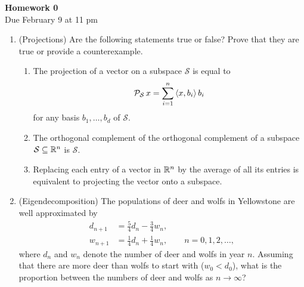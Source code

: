 \documentclass[12pt,twoside]{article}
\begin{document}
\begin{center}
{\large{\textbf{Homework 0}} } \vspace{0.2cm}\\
Due February 9 at 11 pm
\end{center}

\begin{enumerate}
\item (Projections) Are the following statements true or false? Prove that they are true or provide a counterexample. 
\begin{enumerate}
\item The projection of a vector on a subspace $\mathcal{S}$ is equal to 
\begin{align*}
\mathcal{P}_{\mathcal{S}} \, x = \sum_{i=1}^n \left \langle x, b_i\right \rangle b_i
\end{align*}
for any basis $b_1, \ldots, b_d$ of $\mathcal{S}$.
\item The orthogonal complement of the orthogonal complement of a subspace $\mathcal{S}\subseteq \mathbb{R}^n$ is $\mathcal{S}$.
\item Replacing each entry of a vector in $\mathbb{R}^n$ by the average of all its entries is equivalent to projecting the vector onto a subspace. 
\end{enumerate}
\vspace{0.4cm}
\item (Eigendecomposition) The populations of deer and wolfs in Yellowstone are well approximated by   
\begin{align}
d_{n+1} & = \frac{5}{4}d_n - \frac{3}{4}w_n , \\
w_{n+1} & = \frac{1}{4}d_n + \frac{1}{4}w_n, \qquad n=0,1,2,\ldots,
\end{align}
where $d_n$ and $w_n$ denote the number of deer and wolfs in year $n$. Assuming that there are more deer than wolfs to start with ($w_0 < d_0$), what is the proportion between the numbers of deer and wolfs as $n\rightarrow \infty$? 


\end{enumerate}
\end{document}
